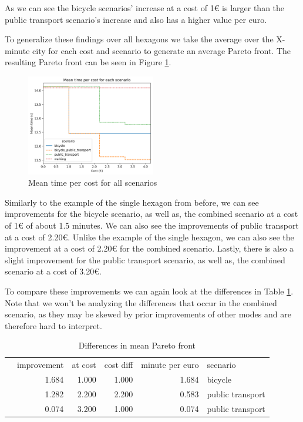 As we can see the bicycle scenarios' increase at a cost of 1€ is larger than the public transport scenario's increase and also has a higher value per euro.


To generalize these findings over all hexagons we take the average over the X-minute city for each cost and scenario to generate an average Pareto front.
The resulting Pareto front can be seen in Figure \ref{fig:mean_time_per_cost}.

\begin{figure}
  \begin{center}
     \includegraphics[width=0.5\textwidth]{Figures/results/metric_cost/mean_time_per_cost}
  \end{center}
  \caption{Mean time per cost for all scenarios}
  \label{fig:mean_time_per_cost}
\end{figure}

Similarly to the example of the single hexagon from before, we can see improvements for the bicycle scenario, as well as, the combined scenario at a cost of 1€ of about 1.5 minutes.
We can also see the improvements of public transport at a cost of 2.20€.
Unlike the example of the single hexagon, we can also see the improvement at a cost of 2.20€ for the combined scenario.
Lastly, there is also a slight improvement for the public transport scenario, as well as, the combined scenario at a cost of 3.20€.

To compare these improvements we can again look at the differences in Table \ref{tab:differences_in_mean_pareto_front}.
Note that we won't be analyzing the differences that occur in the combined scenario, as they may be skewed by prior improvements of other modes and are therefore hard to interpret.

\begin{table}
  \caption{Differences in mean Pareto front}
  \label{tab:differences_in_mean_pareto_front}
  \begin{center}
    \begin{tabular}{lrrrrl}
     & improvement & at cost & cost diff & minute per euro & scenario \\
     & 1.684 & 1.000 & 1.000 & 1.684 & bicycle \\
     & 1.282 & 2.200 & 2.200 & 0.583 & public transport \\
     & 0.074 & 3.200 & 1.000 & 0.074 & public transport \\
    \end{tabular}
  \end{center}
\end{table}

